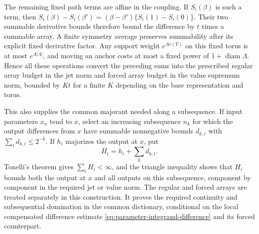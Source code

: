 The remaining fixed path terms are affine in the coupling. If
$S_i(\beta)$ is such a term, then
$S_i(\beta)-S_i(\beta')=(\beta-\beta')\{S_i(1)-S_i(0)\}$.
Their two summable derivative bounds therefore bound the difference
by $t$ times a summable array. A finite symmetry average preserves
summability after its explicit fixed derivative factor. Any support
weight $e^{Ac(Y)}$ on this fixed torus is at most $e^{A|\Lambda|}$,
and moving an anchor costs at most a fixed power of
$1+\operatorname{diam}\Lambda$. Hence all these operations convert
the preceding sums into the prescribed regular array budget in the jet norm and forced array
budget in the value supremum norm, bounded by $Kt$ for a finite $K$ depending on the base
representation and torus.

This also supplies the common majorant needed along a subsequence.
If input parameters $x_n$ tend to $x$, select an increasing subsequence
$n_k$ for which the output differences from $x$ have summable
nonnegative bounds $d_{k,i}$ with $\sum_i d_{k,i}\le2^{-k}$.
If $h_i$ majorizes the output at $x$, put
\[
                         H_i=h_i+\sum_k d_{k,i}.
\]
Tonelli's theorem gives $\sum_iH_i<\infty$, and the triangle
inequality shows that $H_i$ bounds both the output at $x$ and all
outputs on this subsequence, component by component in the required
jet or value norm. The regular and forced arrays are treated
separately in this construction. It proves the required continuity
and subsequential domination in the common dictionary, conditional
on the local compensated difference estimate
\eqref{eq:parameter-integrand-difference} and its forced counterpart.
